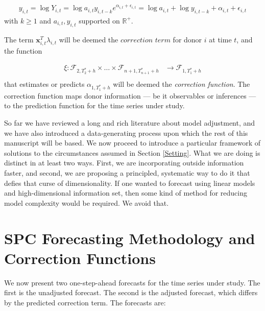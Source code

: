 \documentclass{uiucthesis2021}
\newcommand{\xx}{\textbf{x}}
\theoremstyle{definition}
\begin{document}
  \begin{align*} 
    y_{i,t} = \log{Y_{i,t}} = \log{a_{i,t}y_{i,t-k}e^{\alpha_{i,t}+\epsilon_{i,t}}} = \log{a_{i,t}} + \log{y_{i, t-k}} + \alpha_{i,t} + \epsilon_{i,t}
  \end{align*}
  with $k\geq1$ and $a_{i,t}, y_{i,t}$ supported on $\mathbb{R}^{+}$.  
  
  The term $\xx^{T}_{i,t}\lambda_{i,t}$ will be deemed the $\textit{correction term}$ for donor $i$ at time $t$, and the function
  
  \begin{align*}
    \xi \colon \mathcal{F}_{2,T^{*}_{2}+h} \times \ldots \times \mathcal{F}_{n+1, T^{*}_{n+1}+h} &\to \mathcal{F}_{1,T^{*}_{1}+h}\\
  \end{align*}
  that estimates or predicts $\alpha_{1,T^{*}_{1}+h}$ will be deemed the \textit{correction function}.  The correction function maps donor information --- be it observables or inferences --- to the prediction function for the time series under study.  
  
  So far we have reviewed a long and rich literature about model adjustment, and we have also introduced a data-generating process upon which the rest of this manuscript will be based.  We now proceed to introduce a particular framework of solutions to the circumstances assumed in Section \ref{Setting}.  What we are doing is distinct in at least two ways.  First, we are incorporating outside information faster, and second, we are proposing a principled, systematic way to do it that defies that curse of dimensionality.  If one wanted to forecast using linear models and high-dimensional information set, then some kind of method for reducing model complexity would be required.  We avoid that.
  
  \section{SPC Forecasting Methodology and Correction Functions}
  
  We now present two one-step-ahead forecasts for the time series under study. The first is the unadjusted forecast. The second is the adjusted forecast, which differs by the predicted correction term.  The forecasts are: 
  
\end{document}
